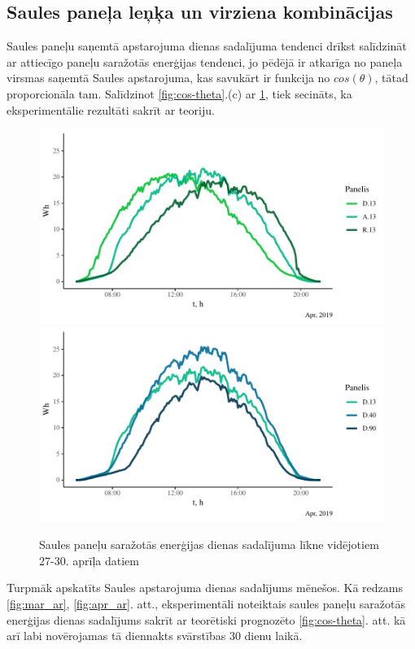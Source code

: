 \subsection{Saules paneļa leņķa un virziena kombinācijas}
\label{subsection:month_day}

Saules paneļu saņemtā apstarojuma dienas sadalījuma tendenci drīkst salīdzināt ar attiecīgo paneļu saražotās enerģijas tendenci, jo pēdējā ir atkarīga no paneļa virsmas saņemtā Saules apstarojuma, kas savukārt ir funkcija no $cos(\theta)$, tātad proporcionāla tam. Salīdzinot \ref{fig:cos-theta}.(c) ar 
\ref{fig:toldU}, tiek secināts, ka eksperimentālie rezultāti sakrīt ar teoriju.

\begin{figure}[h]
    \centering
    \includegraphics[width=\linewidth]{figures/sol_day/apr_LG_13.pdf}
    \includegraphics[width=\linewidth]{figures/sol_day/apr_LG_D.pdf}
    \caption{Saules paneļu saražotās enerģijas dienas sadalījuma līkne vidējotiem 27-30. aprīļa datiem} \label{fig:toldU}
\end{figure}

Turpmāk apskatīts Saules apstarojuma dienas sadalījums mēnešos. Kā redzams \ref{fig:mar_ar}, \ref{fig:apr_ar}. att., eksperimentāli noteiktais saules paneļu saražotās enerģijas dienas sadalījums sakrīt ar teorētiski prognozēto \ref{fig:cos-theta}. att. kā arī labi novērojamas tā diennakts svārstības 30 dienu laikā.

